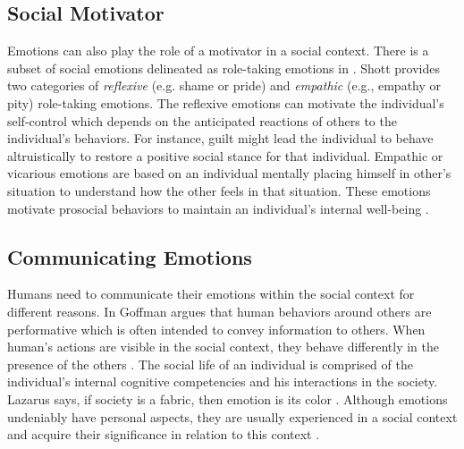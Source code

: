 \documentclass[11pt]{article}
\begin{document}
\subsection{Social Motivator}

Emotions can also play the role of a motivator in a social context. There is a
subset of social emotions delineated as role-taking emotions in
\cite{shott:emotion-social-life}. Shott provides two categories of
\textit{reflexive} (e.g. shame or pride) and \textit{empathic} (e.g., empathy or
pity) role-taking emotions. The reflexive emotions can motivate the individual's
self-control which depends on the anticipated reactions of others to the
individual's behaviors. For instance, guilt might lead the individual to behave
altruistically to restore a positive social stance for that individual. Empathic
or vicarious emotions are based on an individual mentally placing himself in
other's situation to understand how the other feels in that situation. These
emotions motivate prosocial behaviors to maintain an individual's internal
well-being \cite{thoits:socialogy-emotion}.

\subsection{Communicating Emotions}

Humans need to communicate their emotions within the social context
for different reasons. In \cite{goffman:self-presentation} Goffman argues that
human behaviors around others are performative which is often intended to convey
information to others. When human's actions are visible in the social context,
they behave differently in the presence of the others
\cite{zajonc:social-facilitation}. The social life of an individual is comprised
of the individual's internal cognitive competencies and his interactions in the
society. Lazarus says, if society is a fabric, then emotion is its color
\cite{lazarus:emotion-adaptation}. Although emotions undeniably have personal
aspects, they are usually experienced in a social context and acquire their
significance in relation to this context
\cite{parkinson:emotion-social-interaction}.
\end{document}
